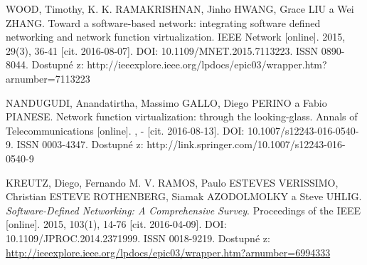 \begin{thebibliography}{10}
WOOD, Timothy, K. K. RAMAKRISHNAN, Jinho HWANG, Grace LIU a Wei ZHANG. Toward a software-based network: integrating software defined networking and network function virtualization. IEEE Network [online]. 2015, 29(3), 36-41 [cit. 2016-08-07]. DOI: 10.1109/MNET.2015.7113223. ISSN 0890-8044. Dostupné z: http://ieeexplore.ieee.org/lpdocs/epic03/wrapper.htm?arnumber=7113223

NANDUGUDI, Anandatirtha, Massimo GALLO, Diego PERINO a Fabio PIANESE. Network function virtualization: through the looking-glass. Annals of Telecommunications [online]. , - [cit. 2016-08-13]. DOI: 10.1007/s12243-016-0540-9. ISSN 0003-4347. Dostupné z: http://link.springer.com/10.1007/s12243-016-0540-9



KREUTZ, Diego, Fernando M. V. RAMOS, Paulo ESTEVES VERISSIMO, Christian ESTEVE ROTHENBERG, Siamak AZODOLMOLKY a Steve UHLIG. \emph{Software-Defined Networking: A Comprehensive Survey}. Proceedings of the IEEE [online]. 2015, 103(1), 14-76 [cit. 2016-04-09]. DOI: 10.1109/JPROC.2014.2371999. ISSN 0018-9219. Dostupné z: \url{http://ieeexplore.ieee.org/lpdocs/epic03/wrapper.htm?arnumber=6994333}



\end{thebibliography}